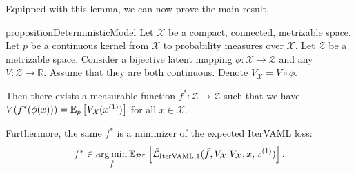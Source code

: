 Equipped with this lemma, we can now prove the main result.

\begin{restatable}{proposition}{DeterministicModel}\label{prop:cvaml:3_1}
    Let $\mathcal{X}$ be a compact, connected, metrizable space. Let $p$ be a continuous kernel from $\mathcal{X}$ to probability measures over $\mathcal{X}$. Let $\mathcal{Z}$ be a metrizable space. Consider a bijective latent mapping $\phi: \mathcal{X} \rightarrow \mathcal{Z}$ and any $V: \mathcal{Z} \rightarrow \mathbb{R}$. Assume that they are both continuous. Denote $V_\mathcal{X} = V \circ \phi$.
    
    Then there exists a measurable function $f^*: \mathcal{Z} \rightarrow \mathcal{Z}$ such that we have $V(f^*(\phi(x))) = \mathbb{E}_{p}\left[  V_\mathcal{X}(x^{(1)}) \right]$ for all $x \in \mathcal{X}$.

    Furthermore, the same $f^*$ is a minimizer of the expected IterVAML loss:
    $$f^* \in \operatorname*{arg\,min}_{\hat{f}} \mathbb{E}_{\mathcal{P}^\pi}\left[  \hat{\mathcal{L}}_{\mathrm{IterVAML},1}(\hat{f},V_\mathcal{X}|V_\mathcal{X},x,x^{(1)}) \right].$$
\end{restatable}


